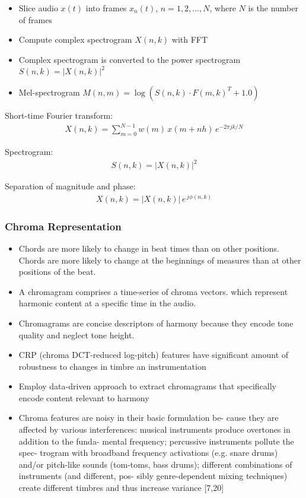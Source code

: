 \documentclass{scrartcl}
\begin{document}
\begin{itemize}
\item Slice audio $x(t)$ into frames $x_n(t)$, $n = 1, 2,\dots, N$, where $N$ is the number of frames
\item Compute complex spectrogram $X(n,k)$ with FFT 
\item Complex spectrogram is converted to the power spectrogram $S(n, k) = |X(n, k)|^2$
\item Mel-spectrogram $M(n,m) = \log \left( S(n,k) \cdot F(m,k)^T + 1.0 \right)$
\end{itemize}
\vspace{1em}

Short-time Fourier transform:
\begin{align}
X(n,k) = \sum_{m = 0}^{N-1} w(m) \, x(m + n  h) \, e^{-2 \pi j  k /N}
\end{align} 

Spectrogram: 
\begin{align}
S(n,k) = |X(n,k)|^2
\end{align} 

Separation of magnitude and phase:
\begin{align} 
X(n,k) = |X(n,k)| \, e^{\, j \phi(n,k)}
\end{align} 


\subsubsection{Chroma Representation}

\begin{itemize}
\item Chords are more likely to change in beat times than on other positions. Chords are more likely to change at the beginnings of measures than at other positions of the beat.
\item A chromagram comprises a time-series of chroma vectors. which represent harmonic content at a specific time in the audio.
\item Chromagrams are concise descriptors of harmony because they encode tone quality and neglect tone height.
\item CRP (chroma DCT-reduced log-pitch) features have significant amount of robustness to changes in timbre an instrumentation \cite[Mueller2010]{Mueller2010}
\item Employ data-driven approach to extract chromagrams that specifically encode content relevant to harmony 
\item Chroma features are noisy in their basic formulation be- cause they are affected by various interferences: musical instruments produce overtones in addition to the funda- mental frequency; percussive instruments pollute the spec- trogram with broadband frequency activations (e.g. snare drums) and/or pitch-like sounds (tom-toms, bass drums); different combinations of instruments (and different, pos- sibly genre-dependent mixing techniques) create different timbres and thus increase variance [7,20] \cite{Korzeniowski2016}
\end{itemize}
\end{document}
